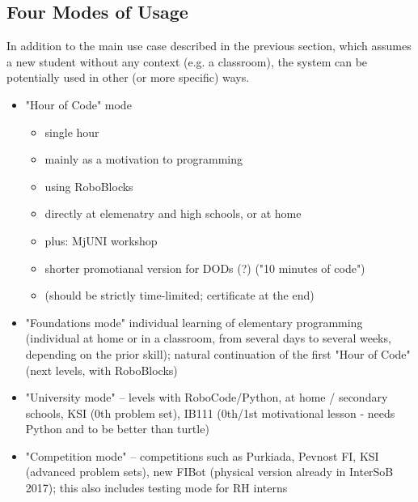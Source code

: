 

\subsection{Four Modes of Usage}
\label{sec:robomission.use-cases}

In addition to the main use case described in the previous section,
which assumes a new student without any context (e.g. a classroom),
the system can be potentially used in other (or more specific) ways.

\begin{itemize}
\item "Hour of Code" mode
  \begin{itemize}
  \item single hour
  \item mainly as a motivation to programming
  \item using RoboBlocks
  \item directly at elemenatry and high schools, or at home
  \item plus: MjUNI workshop
  \item shorter promotianal version for DODs (?) ("10 minutes of code")
  \item (should be strictly time-limited; certificate at the end)
  \end{itemize}
\item "Foundations mode" individual learning of elementary programming (individual at home or in a classroom, from several days to several weeks, depending on the prior skill); natural continuation of the first "Hour of Code" (next levels, with RoboBlocks)
\item "University mode" -- levels with RoboCode/Python, at home / secondary schools, KSI (0th problem set), IB111 (0th/1st motivational lesson - needs Python and to be better than turtle)
\item "Competition mode" -- competitions such as Purkiada, Pevnost FI, KSI (advanced problem sets), new FIBot (physical version already in InterSoB 2017); this also includes testing mode for RH interns
\end{itemize}

